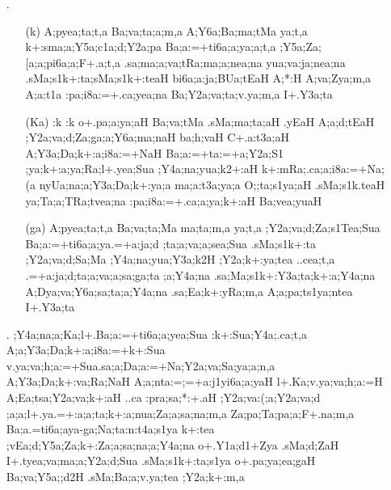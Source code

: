 \begin{spacing}{1.15}
\begin{itemize}
\item[{\sktf 4}.] \begin{itemize}
  \item[({\sktf k})] {\sktf A;pyea;ta;t,a Ba;va;ta;a;m,a A;Y6a;Ba;ma;tMa
ya;t,a k+:sma;a;Y5a;c1a;d;Y2a;pa Ba;a:=+ti6a;a;ya;a;t,a
;Y5a;Za;[a;a;pi6a;a;F+.a;t,a .sa;ma;a;va;tRa;ma;a;nea;na yua;va:ja;nea;na
.sMa;s1k+:ta;sMa;s1k+:teaH
bi6a;a:ja;BUa;tEaH A;*:H
A;va;Zya;m,a A;a:t1a :pa;i8a:=+.ca;yea;na Ba;Y2a;va;ta;v.ya;m,a
I+.Y3a;ta}
                
   \item[({\sktf Ka})] {\sktf :k :k o+.pa;a;ya;aH
Ba;va;tMa .sMa;ma;ta;aH .yEaH A;a;d;tEaH
;Y2a;va;d;Za;ga;a;Y6a;ma;naH ba;h;vaH C+.a:t3a;aH
A;Y3a;Da;k+:a;i8a:=+NaH\ZF{,} Ba;a:=+ta:=+a;Y2a;S1%
;ya;k+:a;ya;Ra;l+.yea;Sua ;Y4a;na;yua;k2+:aH\break
k+:mRa;.ca;a;i8a:=+Na;(a\ZF{,} nyUa;na;a;Y3a;Da;k+:ya;a
ma;a:t3a;ya;a O;;ta;s1ya;aH .sMa;s1k.teaH ya;Ta;a;TRa;tvea;na :pa;i8a:=+.ca;a;ya;k+:aH
Ba;vea;yuaH}
                
 \item[({\sktf ga})] {\sktf A;pyea;ta;t,a Ba;va;ta;Ma ma;ta;m,a\ZF{,} ya;t,a
;Y2a;va;d;Za;s1Tea;Sua Ba;a:=+ti6a;a;ya\ZF{-}.=+a:ja;d%
;ta;a;va;a;sea;Sua .sMa;s1k+:ta
;Y2a;va;d;Sa;Ma ;Y4a;na;yua;Y3a;k2H
;Y2a;k+:ya;tea ..cea;t,a\ZF{,} .=+a:ja;d;ta;a;va;a;sa;ga;ta%
;a;Y4a;na .sa;Ma;s1k+:Y3a;ta;k+:a;Y4a;na
A;Dya;va;Y6a;sa;ta;a;Y4a;na .sa;Ea;k+:yRa;m,a A;a;pa;ts1ya;ntea
I+.Y3a;ta}
\end{itemize} 
           
 \item[{\sktf 5}.]  {\sktf ;Y4a;na;a;Ka;l+.Ba;a:=+ti6a;a;yea;Sua
:k+:Sua;Y4a;.ca;t,a A;a;Y3a;Da;k+:a;i8a:=+k+:Sua
v.ya;va;h;a:=+Sua\ZF{-}.sa;a;Da;a:=+Na;Y2a;va;Sa;ya;a;n,a
A;Y3a;Da;k+:va;Ra;NaH A;a;nta:=;=+a:j1yi6a;a;yaH
l+.Ka;v.ya;va;h;a:=H\ZF{,} A;Ea;tsa;Y2a;va;k+:aH
..ca :pra;sa;*:+.aH ;Y2a;va:(;a;Y2a;va;d%
;a;a;l+.ya\ZF{-}.=+:a;a;ta;k+:a;nua;Za;a;sa;na;m,a%
\ZF{,} Za;pa;Ta;pa;a;F+.na;m,a}  {\sktf Ba;a}{\sktf .=}{\sktf ti6a;a}{\sktf ya}-{\sktf ga;Na;ta:n:t4a;s1ya
k+:tea ;vEa;d;Y5a;Za;k+:Za;a;sa;na;a;Y4a;na
o+.Y1a;d1+Zya .sMa;d;ZaH\ZF{,} I+.tyea;va;ma;a;Y2a;d;Sua%
\ZF{-}.sMa;s1k+:ta;s1ya o+.pa;ya;ea;gaH
Ba;va;Y5a;;d2H .sMa;Ba;a;v.ya;tea ;Y2a;k+:m,a}
 

\end{itemize}
\end{spacing}
